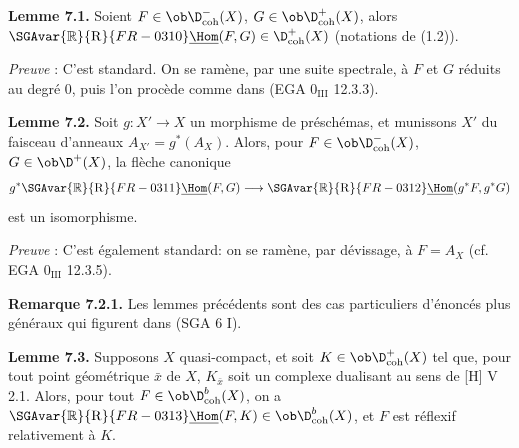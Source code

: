 \textbf{Lemme 7.1.} Soient $F\in\ob\D^{-}_{\mathrm{coh}}(X)$, $G\in\ob\D^{+}_{\mathrm{coh}}(X)$, alors $\SGAvar{\mathbb{R}}{\mathrm{R}}{FR-0310}\underline{\Hom}(F,G)\in\D^{+}_{\mathrm{coh}}(X)$ (notations de (1.2)).

\emph{Preuve} : C'est standard. On se ramène, par une suite spectrale, à $F$ et $G$ réduits au degré $0$, puis l'on procède comme dans (EGA $0_{\mathrm{III}}$ 12.3.3).

\textbf{Lemme 7.2.} Soit $g:X'\to X$ un morphisme de préschémas, et munissons $X'$ du faisceau d'anneaux $A_{X'}=g^*(A_X)$. Alors, pour $F\in\ob\D^{-}_{\mathrm{coh}}(X)$, $G\in\ob\D^{+}(X)$, la flèche canonique
\[
        g^*\SGAvar{\mathbb{R}}{\mathrm{R}}{FR-0311}\underline{\Hom}(F,G)\longrightarrow \SGAvar{\mathbb{R}}{\mathrm{R}}{FR-0312}\underline{\Hom}(g^*F,g^*G)
\]
est un isomorphisme.

\emph{Preuve} : C'est également standard: on se ramène, par dévissage, à $F=A_X$ (cf. EGA $0_{\mathrm{III}}$ 12.3.5).

\textbf{Remarque 7.2.1.} Les lemmes précédents sont des cas particuliers d'énoncés plus généraux qui figurent dans (SGA 6 I).

\textbf{Lemme 7.3.} Supposons $X$ quasi-compact, et soit $K\in\ob\D^{+}_{\mathrm{coh}}(X)$ tel que, pour tout point géométrique $\bar{x}$ de $X$, $K_{\bar{x}}$ soit un complexe dualisant au sens de [H] V 2.1. Alors, pour tout $F\in\ob\D^{b}_{\mathrm{coh}}(X)$, on a $\SGAvar{\mathbb{R}}{\mathrm{R}}{FR-0313}\underline{\Hom}(F,K)\in\ob\D^{b}_{\mathrm{coh}}(X)$, et $F$ est réflexif relativement à $K$.

